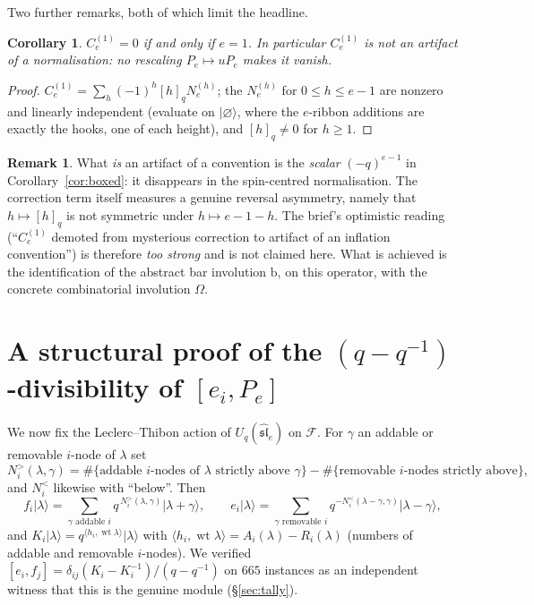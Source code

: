 \documentclass[11pt]{article}
\theoremstyle{plain}
\newtheorem{corollary}[theorem]{Corollary}
\theoremstyle{definition}
\newtheorem{remark}[theorem]{Remark}
\newcommand{\F}{\mathcal{F}}
\newcommand{\Om}{\Omega}
\newcommand{\qq}{(q-q^{-1})}
\newcommand{\Ce}{C_e^{(1)}}
\newcommand{\N}[1]{N_e^{(#1)}}
\newcommand{\wt}{\operatorname{wt}}
\begin{document}
Two further remarks, both of which limit the headline.

\begin{corollary}\label{cor:notartifact}
$\Ce=0$ if and only if $e=1$.  In particular $\Ce$ is \emph{not} an artifact
of a normalisation: no rescaling $P_e\mapsto uP_e$ makes it vanish.
\end{corollary}
\begin{proof}
$\Ce=\sum_h(-1)^h[h]_q\N{h}$; the $\N{h}$ for $0\le h\le e-1$ are nonzero and
linearly independent (evaluate on $\lvert\varnothing\rangle$, where the
$e$-ribbon additions are exactly the hooks, one of each height), and
$[h]_q\ne0$ for $h\ge1$.
\end{proof}

\begin{remark}
What \emph{is} an artifact of a convention is the \emph{scalar} $(-q)^{e-1}$
in Corollary~\ref{cor:boxed}: it disappears in the spin-centred normalisation.
The correction term itself measures a genuine reversal asymmetry, namely that
$h\mapsto[h]_q$ is not symmetric under $h\mapsto e-1-h$.  The brief's
optimistic reading (``$\Ce$ demoted from mysterious correction to artifact of
an inflation convention'') is therefore \emph{too strong} and is not claimed
here.  What is achieved is the identification of the abstract bar involution
$\mathrm{b}$, on this operator, with the concrete combinatorial involution
$\Om$.
\end{remark}

\section{A structural proof of the $\qq$-divisibility of $[e_i,P_e]$}
\label{sec:t2}

We now fix the Leclerc--Thibon action of $U_q(\widehat{\mathfrak{sl}}_e)$ on
$\F$.  For $\gamma$ an addable or removable $i$-node of $\lambda$ set
\[
  N^{>}_i(\lambda,\gamma)=\#\{\text{addable $i$-nodes of $\lambda$ strictly
  above }\gamma\}-\#\{\text{removable $i$-nodes strictly above}\},
\]
and $N^{<}_i$ likewise with ``below''.  Then
\[
  f_i\lvert\lambda\rangle=\sum_{\gamma \text{ addable }i}
     q^{\,N^{>}_i(\lambda,\gamma)}\lvert\lambda+\gamma\rangle,
  \qquad
  e_i\lvert\lambda\rangle=\sum_{\gamma \text{ removable }i}
     q^{-N^{<}_i(\lambda\!-\!\gamma,\gamma)}\lvert\lambda-\gamma\rangle,
\]
and $K_i\lvert\lambda\rangle=q^{\langle h_i,\wt\lambda\rangle}
\lvert\lambda\rangle$ with $\langle h_i,\wt\lambda\rangle=
A_i(\lambda)-R_i(\lambda)$ (numbers of addable and removable $i$-nodes).  We
verified $[e_i,f_j]=\delta_{ij}(K_i-K_i^{-1})/\qq$ on $665$ instances as an
independent witness that this is the genuine module (\S\ref{sec:tally}).
\end{document}
